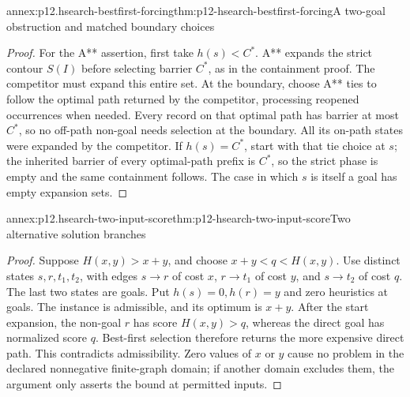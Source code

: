\begin{annexitem}{annex:p12.hsearch-bestfirst-forcing}{thm:p12-hsearch-bestfirst-forcing}{A two-goal obstruction and matched boundary choices}
\begin{proof}
For the A** assertion, first take \(h(s)<C^*\). A** expands the
strict contour \(S(I)\) before selecting barrier \(C^*\), as in
the containment proof. The competitor must expand this entire set.
At the boundary, choose A** ties to follow the optimal path returned by
the competitor, processing reopened occurrences when needed. Every
record on that optimal path has barrier at most \(C^*\), so no
off-path non-goal needs selection at the boundary. All its on-path
states were expanded by the competitor. If \(h(s)=C^*\), start
with that tie choice at \(s\); the inherited barrier of every
optimal-path prefix is \(C^*\), so the strict phase is empty and
the same containment follows. The case in which \(s\) is itself
a goal has empty expansion sets.
\end{proof}
\end{annexitem}

\begin{annexitem}{annex:p12.hsearch-two-input-score}{thm:p12-hsearch-two-input-score}{Two alternative solution branches}
\begin{proof}
Suppose \(H(x,y)>x+y\), and choose
\(x+y<q<H(x,y)\). Use distinct states \(s,r,t_1,t_2\), with
edges \(s\to r\) of cost \(x\), \(r\to t_1\) of cost
\(y\), and \(s\to t_2\) of cost \(q\). The last two states
are goals. Put \(h(s)=0,h(r)=y\) and zero heuristics at goals.
The instance is admissible, and its optimum is \(x+y\).
After the start expansion, the non-goal \(r\) has score
\(H(x,y)>q\), whereas the direct goal has normalized score \(q\).
Best-first selection therefore returns the more expensive direct path.
This contradicts admissibility. Zero values of \(x\) or \(y\)
cause no problem in the declared nonnegative finite-graph domain; if
another domain excludes them, the argument only asserts the bound at
permitted inputs.
\end{proof}
\end{annexitem}

